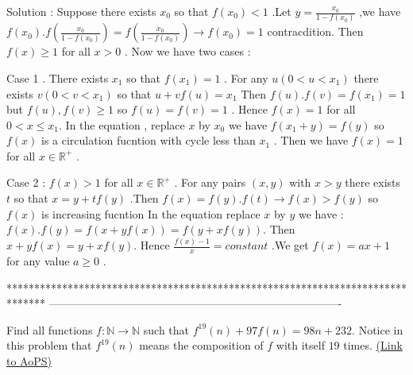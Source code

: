 \begin{mysolution}
	Solution :
Suppose there exists $ x_{0}$ so that $ f(x_{0})<1$ .Let $ y=\frac{x_{0}}{1-f(x_{0})}$ ,we have $ f(x_{0}).f(\frac{x_{0}}{1-f(x_{0})})=f(\frac{x_{0}}{1-f(x_{0})})\to f(x_{0})=1$ contracdition.
Then $ f(x)\ge 1$ for all $ x>0$ . Now we have two cases :

Case 1 . There exists $ x_{1}$ so that $ f(x_{1})=1$ .
For any $ u( 0<u<x_{1})$ there exists $ v( 0<v<x_{1})$ so that $ u+vf(u)=x_{1}$
Then $ f(u).f(v)=f(x_{1})=1$ but $ f(u),f(v)\ge 1$ so $ f(u)=f(v)=1$ .
Hence $ f(x)=1$ for all $ 0<x\le x_{1}$.
In the equation , replace $ x$ by $ x_{0}$ we have $ f(x_{1}+y)=f(y)$ so $ f(x)$ is a circulation fucntion with cycle less than $ x_{1}$ . Then we have $ f(x)=1$ for all $ x\in \mathbb{R}^{+}$ .

Case 2 : $ f(x)>1$ for all $ x\in \mathbb{R}^{+}$ . For any pairs $ (x,y)$ with $ x>y$ there exists $ t$ so that $ x=y+tf(y)$ .Then $ f(x)=f(y).f(t)\to f(x)>f(y)$ so $ f(x)$ is increasing fucntion 
In the equation replace $ x$ by $ y$ we have :$ f(x).f(y)=f(x+yf(x))=f(y+xf(y))$.
Then $ x+yf(x)=y+xf(y)$.
Hence $ \frac{f(x)-1}{x}=constant$ .We get $ f(x)=ax+1$ for any value $ a\ge 0$  .
\end{mysolution}
*******************************************************************************
-------------------------------------------------------------------------------

\begin{problem}
	Find all functions $f: \mathbb N \to \mathbb N$ such that $ f^{19}(n)+97f(n)=98n+232$. Notice in this problem that $f^{19}(n)$ means the composition of $f$ with itself $19$ times.
	\flushright \href{https://artofproblemsolving.com/community/c6h161994}{(Link to AoPS)}
\end{problem}



